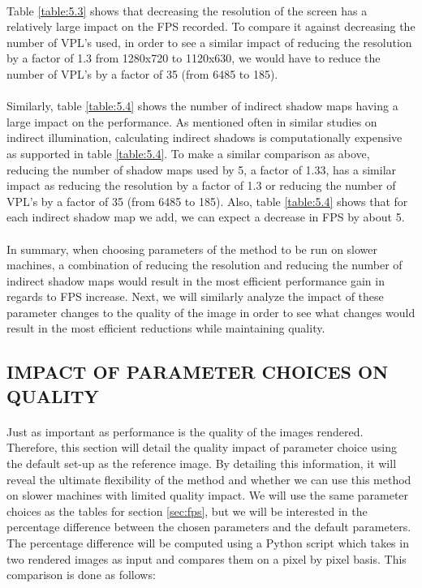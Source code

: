 \paragraph{}
Table \ref{table:5.3} shows that decreasing the resolution of the screen has a relatively large impact on the FPS recorded.  To compare it against decreasing the number of VPL's used, in order to see a similar impact of reducing the resolution by a factor of 1.3 from 1280x720 to 1120x630, we would have to reduce the number of VPL's by a factor of 35 (from 6485 to 185).

\paragraph{}
Similarly, table \ref{table:5.4} shows the number of indirect shadow maps having a large impact on the performance.  As mentioned often in similar studies on indirect illumination, calculating indirect shadows is computationally expensive as supported in table \ref{table:5.4}.  To make a similar comparison as above, reducing the number of shadow maps used by 5, a factor of 1.33, has a similar impact as reducing the resolution by a factor of 1.3 or reducing the number of VPL's by a factor of 35 (from 6485 to 185).  Also, table \ref{table:5.4} shows that for each indirect shadow map we add, we can expect a decrease in FPS by about 5.

\paragraph{}
In summary, when choosing parameters of the method to be run on slower machines, a combination of reducing the resolution and reducing the number of indirect shadow maps would result in the most efficient performance gain in regards to FPS increase.  Next, we will similarly analyze the impact of these parameter changes to the quality of the image in order to see what changes would result in the most efficient reductions while maintaining quality.

\subsection{IMPACT OF PARAMETER CHOICES ON QUALITY} \label{sec:quality}
\paragraph{}
Just as important as performance is the quality of the images rendered.  Therefore, this section will detail the quality impact of parameter choice using the default set-up as the reference image.  By detailing this information, it will reveal the ultimate flexibility of the method and whether we can use this method on slower machines with limited quality impact.  We will use the same parameter choices as the tables for section \ref{sec:fps}, but we will be interested in the percentage difference between the chosen parameters and the default parameters.  The percentage difference will be computed using a Python script which takes in two rendered images as input and compares them on a pixel by pixel basis.  This comparison is done as follows:

